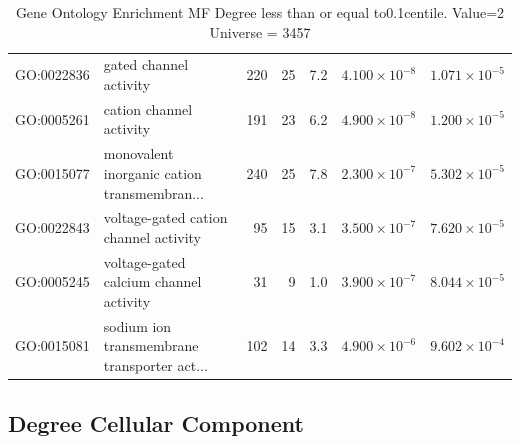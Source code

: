\begin{table}[ht]
\begin{adjustbox}{max width=\textwidth}
\begin{tabular}{llrrrrr}
  GO:0022836 & gated channel activity & 220 & 25 & 7.2 & $4.100 \times 10^{-8}$ & $1.071 \times 10^{-5}$ \\ 
  GO:0005261 & cation channel activity & 191 & 23 & 6.2 & $4.900 \times 10^{-8}$ & $1.200 \times 10^{-5}$ \\ 
  GO:0015077 & monovalent inorganic cation transmembran... & 240 & 25 & 7.8 & $2.300 \times 10^{-7}$ & $5.302 \times 10^{-5}$ \\ 
  GO:0022843 & voltage-gated cation channel activity & 95 & 15 & 3.1 & $3.500 \times 10^{-7}$ & $7.620 \times 10^{-5}$ \\ 
  GO:0005245 & voltage-gated calcium channel activity & 31 & 9 & 1.0 & $3.900 \times 10^{-7}$ & $8.044 \times 10^{-5}$ \\ 
  GO:0015081 & sodium ion transmembrane transporter act... & 102 & 14 & 3.3 & $4.900 \times 10^{-6}$ & $9.602 \times 10^{-4}$ \\ 
   \hline
\end{tabular}
\end{adjustbox}
\caption{Gene Ontology Enrichment MF Degree  less than or equal to0.1centile.   Value=2 Universe = 3457} 
\label{tab:Gene Ontology Enrichment MF Degree  less than or equal to0.1centile.   Value=2 Universe = 3457}
\end{table}


\subsection{Degree Cellular Component}

